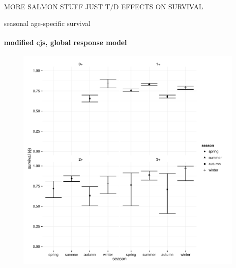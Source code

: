 \documentclass[show notes]{beamer}
\begin{document}
\begin{frame}{MORE SALMON STUFF JUST T/D EFFECTS ON SURVIVAL}
\end{frame}

\begin{frame}{seasonal age-specific survival}
  \framesubtitle{modified cjs, global response model}

	\begin{figure}
	\includegraphics[clip, trim=0 0 0 10, height=.8\textheight]{pl-phi-age-x-season.pdf}
  	\end{figure}

\end{frame}
\end{document}
